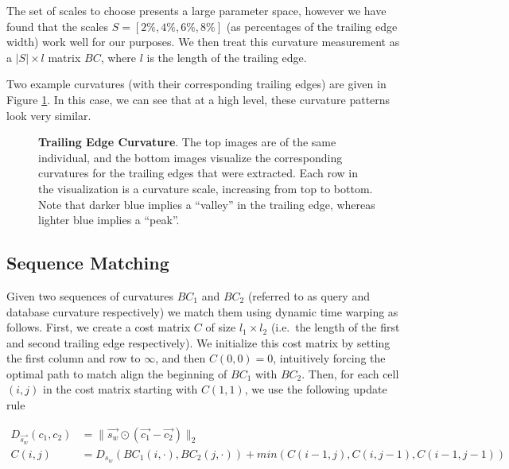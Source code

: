 The set of scales to choose presents a large parameter space, however we have found that the scales $S = [2\%, 4\%, 6\%, 8\%]$ (as percentages of the trailing edge width) work well for our purposes.
We then treat this curvature measurement as a $|S| \times l$ matrix $BC$, where $l$ is the length of the trailing edge.

Two example curvatures (with their corresponding trailing edges) are given in Figure \ref{fig:example_curv}.
In this case, we can see that at a high level, these curvature patterns look very similar.

\begin{figure}[t]%
\centering
{}
\newline
{}
\caption{\textbf{Trailing Edge Curvature}. The top images are of the same individual, and the bottom images visualize the corresponding curvatures for the trailing edges that were extracted. Each row in the visualization is a curvature scale, increasing from top to bottom. Note that darker blue implies a ``valley'' in the trailing edge, whereas lighter blue implies a ``peak''.}
\label{fig:example_curv}
\end{figure}




\subsection{Sequence Matching}

Given two sequences of curvatures $BC_1$ and $BC_2$ (referred to as query and database curvature respectively) we match them using dynamic time warping as follows.
First, we create a cost matrix $C$ of size $l_1 \times l_2$ (i.e.\ the length of the first and second trailing edge respectively). 
We initialize this cost matrix by setting the first column and row to $\infty$, and then $C(0,0) = 0$, intuitively forcing the optimal path to match align the beginning of $BC_1$ with $BC_2$.
Then, for each cell $(i,j)$ in the cost matrix starting with $C(1,1)$, we use the following update rule

\begin{align} 
\label{eqn:dtw_dist}
D_{\vec{s_w}}(c_1, c_2) &= \lVert \vec{s_w} \odot (\vec{c_1} - \vec{c_2}) \rVert_2\\
\label{eqn:dtw_update}
C(i,j) &= D_{s_w}(BC_1(i,\cdot),BC_2(j,\cdot)) + min(C(i-1,j), C(i,j-1), C(i-1, j-1))
\end{align}

